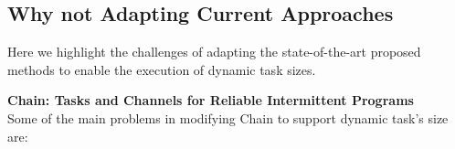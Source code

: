 \documentclass[sigconf,anonymous,review]{acmart}
\begin{document}





\subsection{Why not Adapting Current Approaches}
Here we highlight the challenges of adapting the state-of-the-art proposed methods to enable the execution of dynamic task sizes. 
%


\noindent\textbf{Chain: Tasks and Channels for Reliable Intermittent Programs } \\
Some of the main problems in modifying Chain to support dynamic task's size are:
\end{document}
